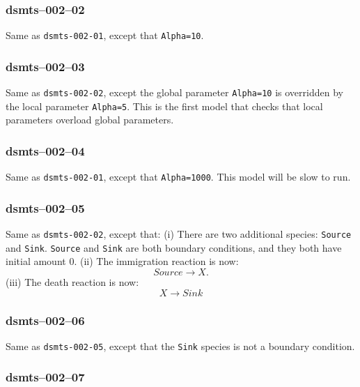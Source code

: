 
\subsubsection{dsmts--002--02}

 Same as \verb$dsmts-002-01$,
except that \verb$Alpha=10$. 


\subsubsection{dsmts--002--03}

 Same as \verb$dsmts-002-02$, except the global
parameter \verb$Alpha=10$ is overridden by the local parameter
\verb$Alpha=5$. This is the first model that checks that local
parameters overload global parameters.


\subsubsection{dsmts--002--04}

Same as \verb$dsmts-002-01$, except that \verb$Alpha=1000$. This model
will be slow to run.


\subsubsection{dsmts--002--05}

 Same as
\verb$dsmts-002-02$, except that: (i) There are two additional species: \verb$Source$ and
\verb$Sink$. \verb$Source$ and \verb$Sink$ are both boundary conditions, and they both have
initial amount 0. (ii) The immigration reaction is now: 
\[
Source \longrightarrow X. 
\]
(iii)
The death reaction is now:
\[
X \longrightarrow Sink 
\]


\subsubsection{dsmts--002--06}

 Same as \verb$dsmts-002-05$, except that
the \verb$Sink$ species is not a boundary condition. 


\subsubsection{dsmts--002--07}

